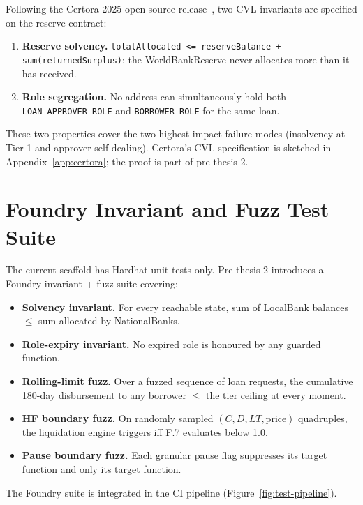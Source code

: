 \documentclass[12pt,a4paper]{report}
\begin{document}
Following the Certora 2025 open-source release~\cite{certoraOpenSource2025}, two CVL invariants are specified on the reserve contract:

\begin{enumerate}[leftmargin=*,itemsep=2pt]
    \item \textbf{Reserve solvency.} \texttt{totalAllocated <= reserveBalance + sum(returnedSurplus)}: the WorldBankReserve never allocates more than it has received.
    \item \textbf{Role segregation.} No address can simultaneously hold both \texttt{LOAN\_APPROVER\_ROLE} and \texttt{BORROWER\_ROLE} for the same loan.
\end{enumerate}

These two properties cover the two highest-impact failure modes (insolvency at Tier 1 and approver self-dealing). Certora's CVL specification is sketched in Appendix~\ref{app:certora}; the proof is part of pre-thesis 2.

\section{Foundry Invariant and Fuzz Test Suite}
\label{sec:foundry}

The current scaffold has Hardhat unit tests only. Pre-thesis 2 introduces a Foundry invariant + fuzz suite covering:

\begin{itemize}[leftmargin=*,itemsep=2pt]
    \item \textbf{Solvency invariant.} For every reachable state, sum of LocalBank balances $\leq$ sum allocated by NationalBanks.
    \item \textbf{Role-expiry invariant.} No expired role is honoured by any guarded function.
    \item \textbf{Rolling-limit fuzz.} Over a fuzzed sequence of loan requests, the cumulative 180-day disbursement to any borrower $\leq$ the tier ceiling at every moment.
    \item \textbf{HF boundary fuzz.} On randomly sampled $(C, D, LT, \text{price})$ quadruples, the liquidation engine triggers iff F.7 evaluates below 1.0.
    \item \textbf{Pause boundary fuzz.} Each granular pause flag suppresses its target function and only its target function.
\end{itemize}

The Foundry suite is integrated in the CI pipeline (Figure~\ref{fig:test-pipeline}).
\end{document}
